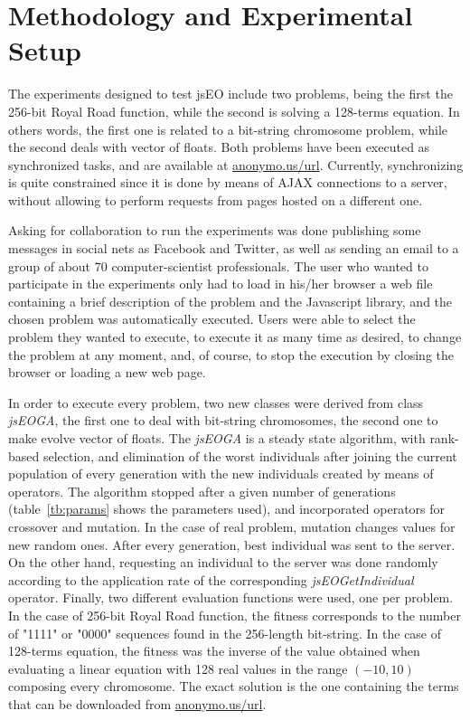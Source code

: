 \documentclass[runningheads,a4paper]{llncs}
\begin{document}
\section{Methodology and Experimental Setup}
\label{sec:method}
The experiments designed to test jsEO include two problems, being the first the 256-bit Royal Road function, while the second is solving a 128-terms equation. In others words, the first one is related to a bit-string chromosome problem, while the second deals with vector of floats. Both problems have been executed as synchronized tasks, and are available at %
\url{anonymo.us/url}. Currently, synchronizing is quite constrained since it is done by means of AJAX connections to a server, without allowing to perform requests from pages hosted on a different one. 

Asking for collaboration to run the experiments was done publishing some messages in social nets as Facebook and Twitter, as well as sending an email to a group of about 70 computer-scientist professionals. The user who wanted to participate in the experiments only had to load in his/her browser a web file containing a brief description of the problem and the Javascript library, and the chosen problem was automatically executed. Users were able to select the problem they wanted to execute, to execute it as many time as desired, to change the problem at any moment, and, of course, to stop the execution by closing the browser or loading a new web page.

In order to execute every problem, two new classes were derived from class \textit{jsEOGA}, the first one to deal with bit-string chromosomes, the second one to make evolve vector of floats. The \textit{jsEOGA} is a steady state algorithm, with rank-based selection, and elimination of the worst individuals after joining the current population of every generation with the new individuals created by means of operators. The algorithm stopped after a given number of generations (table~\ref{tb:params} shows the parameters used), and incorporated operators for crossover and mutation. In the case of real problem, mutation changes values for new random ones. After every generation, best individual was sent to the server. On the other hand, requesting an individual to the server was done randomly according to the application rate of the corresponding \textit{jsEOGetIndividual} operator. Finally, two different evaluation functions were used, one per problem. In the case of 256-bit Royal Road function, the fitness corresponds to the number of "1111" or "0000" sequences found in the 256-length bit-string. In the case of 128-terms equation, the fitness was the inverse of the value obtained when evaluating a linear equation with 128 real values in the range $(-10,10)$ composing every chromosome. The exact solution is the one containing the terms that can be downloaded from \url{anonymo.us/url}.%
	
\end{document}
